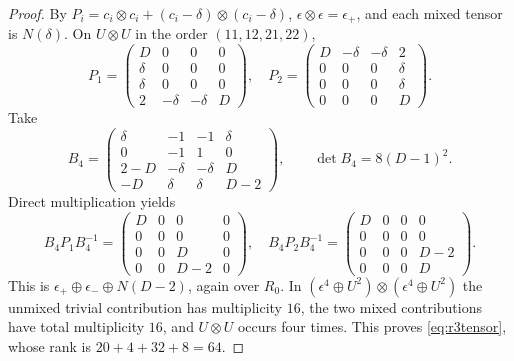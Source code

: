 \documentclass[11pt,a4paper]{article}
\theoremstyle{named}\newtheorem{finding}{Finding}[section]
\theoremstyle{definition}\newtheorem{definition}[finding]{Definition}
\theoremstyle{remark}\newtheorem{remark}[finding]{Remark}
\begin{document}
\begin{proof}
By $P_i=c_i\otimes c_i+(c_i-\delta)\otimes(c_i-\delta)$,
$\epsilon\otimes\epsilon=\epsilon_+$, and each mixed tensor is
$N(\delta)$. On $U\otimes U$ in the order $(11,12,21,22)$,
\[
 P_1=\begin{pmatrix}D&0&0&0\\\delta&0&0&0\\\delta&0&0&0\\
                         2&-\delta&-\delta&D\end{pmatrix},\quad
 P_2=\begin{pmatrix}D&-\delta&-\delta&2\\0&0&0&\delta\\
                         0&0&0&\delta\\0&0&0&D\end{pmatrix}.
\]
Take
\[
 B_4=\begin{pmatrix}
 \delta&-1&-1&\delta\\0&-1&1&0\\
 2-D&-\delta&-\delta&D\\-D&\delta&\delta&D-2
 \end{pmatrix},\qquad \det B_4=8(D-1)^2.
\]
Direct multiplication yields
\[
 B_4P_1B_4^{-1}=\begin{pmatrix}D&0&0&0\\0&0&0&0\\0&0&D&0\\0&0&D-2&0\end{pmatrix},
\quad
 B_4P_2B_4^{-1}=\begin{pmatrix}D&0&0&0\\0&0&0&0\\0&0&0&D-2\\0&0&0&D\end{pmatrix}.
\]
This is $\epsilon_+\oplus\epsilon_-\oplus N(D-2)$, again over $R_0$.
In $(\epsilon^4\oplus U^2)\otimes(\epsilon^4\oplus U^2)$ the unmixed
trivial contribution has multiplicity $16$, the two mixed contributions
have total multiplicity $16$, and $U\otimes U$ occurs four times.
This proves \eqref{eq:r3tensor}, whose rank is $20+4+32+8=64$.


\end{proof}
\end{document}
